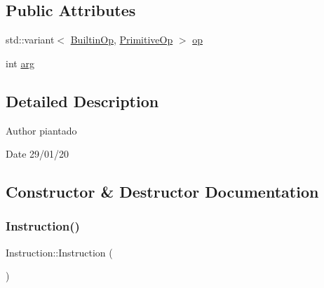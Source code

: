 \subsection*{Public Attributes}
\begin{DoxyCompactItemize}
\item 
std\+::variant$<$ \hyperlink{_instruction_8h_af2fb7c87c5854c5733d7bb0506b06de7}{Builtin\+Op}, \hyperlink{_instruction_8h_a227278394efd1e2313c727102db09ea9}{Primitive\+Op} $>$ \hyperlink{class_instruction_ad6b1f252f404568d2fe80644a7caa224}{op}
\item 
int \hyperlink{class_instruction_a7ed399e29ec58e97a7b6311919f5d5ca}{arg}
\end{DoxyCompactItemize}


\subsection{Detailed Description}
\begin{DoxyAuthor}{Author}
piantado 
\end{DoxyAuthor}
\begin{DoxyDate}{Date}
29/01/20 
\end{DoxyDate}


\subsection{Constructor \& Destructor Documentation}
\mbox{\label{class_instruction_aebd15229c1651af49dcb203707e7a2d5}} 
\subsubsection{\texorpdfstring{Instruction()}{Instruction()}\hspace{0.1cm}{\footnotesize\ttfamily [1/3]}}
{\footnotesize\ttfamily Instruction\+::\+Instruction (\begin{DoxyParamCaption}{ }\end{DoxyParamCaption})\hspace{0.3cm}{\ttfamily [inline]}}

\mbox{\label{class_instruction_a7f672d88ba4ec174716bbac9adb8b1b0}} 
